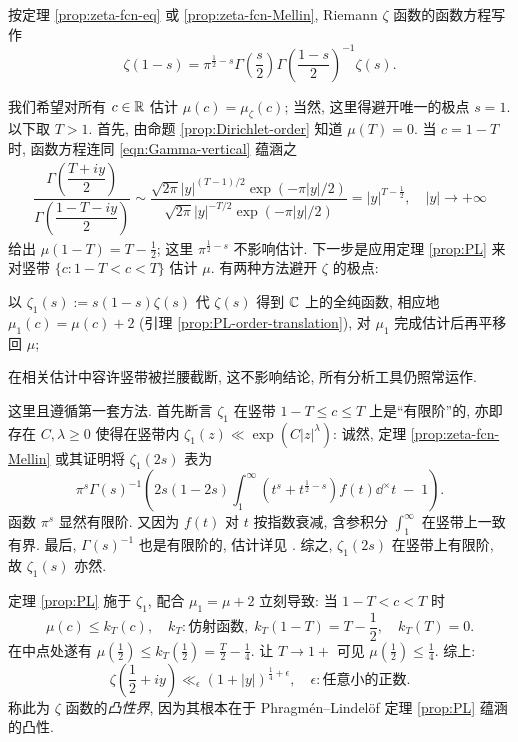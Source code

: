 \begin{example}\label{eg:zeta-convexity}
	按定理 \ref{prop:zeta-fcn-eq} 或 \ref{prop:zeta-fcn-Mellin}, Riemann $\zeta$ 函数的函数方程写作
	\[ \zeta(1-s) = \pi^{\frac{1}{2} - s} \Gamma\left(\dfrac{s}{2}\right) \Gamma\left( \frac{1-s}{2} \right)^{-1} \zeta(s). \]
	
	我们希望对所有 $c \in \mathbb{R}$ 估计 $\mu(c) = \mu_\zeta(c)$; 当然, 这里得避开唯一的极点 $s=1$. 以下取 $T > 1$. 首先, 由命题 \ref{prop:Dirichlet-order} 知道 $\mu(T) = 0$. 当 $c = 1-T$ 时, 函数方程连同 \eqref{eqn:Gamma-vertical} 蕴涵之
	\begin{gather*}
		\dfrac{ \Gamma\left( \dfrac{T+iy}{2} \right) }{ \Gamma\left( \dfrac{1-T-iy}{2} \right) } \sim \dfrac{ \sqrt{2\pi} |y|^{ (T-1)/2 } \exp(-\pi|y|/2) }{ \sqrt{2\pi} |y|^{-T/2} \exp(-\pi|y|/2) } = |y|^{ T - \frac{1}{2} }, \quad |y| \to +\infty
	\end{gather*}
	给出 $\mu(1 - T) = T - \frac{1}{2}$; 这里 $\pi^{\frac{1}{2} - s}$ 不影响估计. 下一步是应用定理 \ref{prop:PL} 来对竖带 $\{c: 1 - T < c < T\}$ 估计 $\mu$. 有两种方法避开 $\zeta$ 的极点:
	\begin{compactitem}
		\item 以 $\zeta_1(s) := s(1-s)\zeta(s)$ 代 $\zeta(s)$ 得到 $\mathbb{C}$ 上的全纯函数, 相应地 $\mu_1(c) = \mu(c) + 2$ (引理 \ref{prop:PL-order-translation}), 对 $\mu_1$ 完成估计后再平移回 $\mu$;
		\item 在相关估计中容许竖带被拦腰截断, 这不影响结论, 所有分析工具仍照常运作.
	\end{compactitem}
	这里且遵循第一套方法. 首先断言 $\zeta_1$ 在竖带 $1-T \leq c \leq T$ 上是``有限阶''的, 亦即存在 $C, \lambda \geq 0$ 使得在竖带内 $\zeta_1(z) \ll  \exp(C|z|^\lambda)$: 诚然, 定理 \ref{prop:zeta-fcn-Mellin} 或其证明将 $\zeta_1(2s)$ 表为
	\[ \pi^s \Gamma(s)^{-1} \left( 2s(1 - 2s) \int_1^\infty \left( t^s + t^{\frac{1}{2} - s}\right) f(t) \dd^\times t \;-\; 1 \right). \]
	函数 $\pi^s$ 显然有限阶. 又因为 $f(t)$ 对 $t$ 按指数衰减, 含参积分 $\int_1^\infty$ 在竖带上一致有界. 最后, $\Gamma(s)^{-1}$ 也是有限阶的, 估计详见 \cite[第六章, 定理 1.6 (ii)]{Ste17}. 综之, $\zeta_1(2s)$ 在竖带上有限阶, 故 $\zeta_1(s)$ 亦然.

	
	定理 \ref{prop:PL} 施于 $\zeta_1$, 配合 $\mu_1 = \mu + 2$ 立刻导致: 当 $1-T < c < T$ 时
	\[ \mu(c) \leq k_T(c), \quad k_T: \text{仿射函数}, \; k_T(1 - T) = T - \frac{1}{2}, \quad k_T(T)=0. \]
	在中点处遂有 $\mu\left(\frac{1}{2}\right) \leq k_T\left(\frac{1}{2}\right) = \frac{T}{2} - \frac{1}{4}$. 让 $T \to 1+$ 可见 $\mu\left(\frac{1}{2}\right) \leq \frac{1}{4}$. 综上:
	\[ \zeta\left( \frac{1}{2} + iy \right) \ll_\epsilon (1 + |y|)^{\frac{1}{4} + \epsilon}, \quad \epsilon: \text{任意小的正数}. \]
	称此为 $\zeta$ 函数的\emph{凸性界}, 因为其根本在于 Phragmén--Lindelöf 定理 \ref{prop:PL} 蕴涵的凸性.


\end{example}
